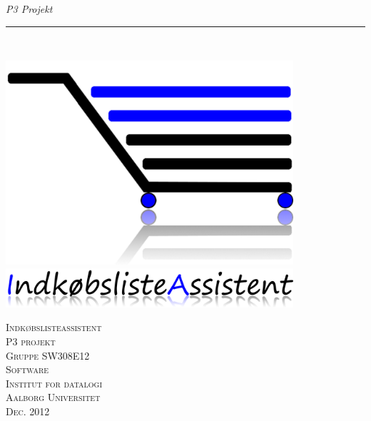 \thispagestyle{empty}
\begin{flushright}
\vspace{3cm}

\phantom{hul}

\phantom{hul}

\phantom{hul}

\textsl{P3 Projekt} \\ \vspace{1cm}

\rule{0.8\textwidth}{3mm} \\ \vspace{1.5cm}
\vspace{1cm}

\includegraphics[width=0.8\textwidth]{billeder/FormaliaForsideLogo.png}
\includegraphics[width=0.8\textwidth]{billeder/FormaliaForsideTekst.png}

\vspace{2cm} 
\textsc{\Large Indkøbslisteassistent \\
P3 projekt\\
Gruppe SW308E12\\
Software\\
Institut for datalogi\\
Aalborg Universitet\\
Dec. 2012\\
}
\end{flushright}
